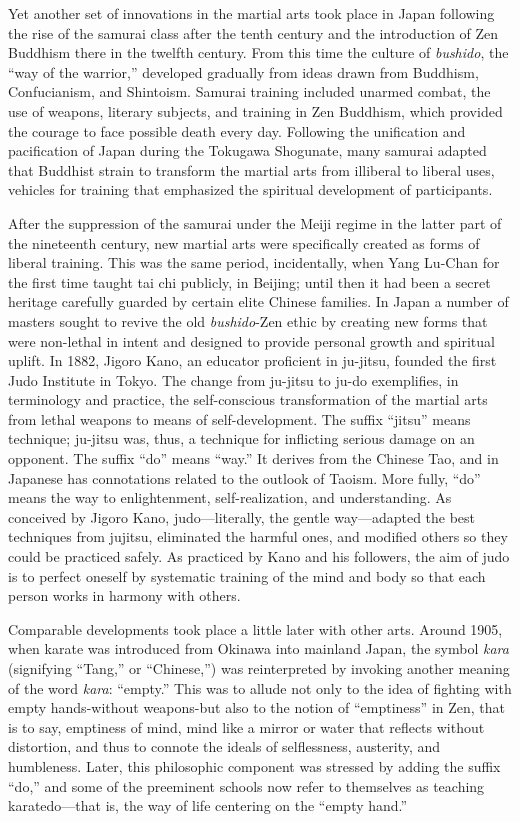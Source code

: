 Yet another set of innovations in the martial arts took place in Japan following the rise of the samurai class after the tenth century and the introduction of Zen Buddhism there in the twelfth century. From this time the culture of \emph{bushido}, the ``way of the warrior,'' developed gradually from ideas drawn from Buddhism, Confucianism, and Shintoism. Samurai training included unarmed combat, the use of weapons, literary subjects, and training in Zen Buddhism, which provided the courage to face possible death every day. Following the unification and pacification of Japan during the Tokugawa Shogunate, many samurai adapted that Buddhist strain to transform the martial arts from illiberal to liberal uses, vehicles for training that emphasized the spiritual development of participants. 

After the suppression of the samurai under the Meiji regime in the latter part of the nineteenth century, new martial arts were specifically created as forms of liberal training. This was the same period, incidentally, when Yang Lu-Chan for the first time taught tai chi publicly, in Beijing; until then it had been a secret heritage carefully guarded by certain elite Chinese families. In Japan a number of masters sought to revive the old \emph{bushido}-Zen ethic by creating new forms that were non-lethal in intent and designed to provide personal growth and spiritual uplift. In 1882, Jigoro Kano, an educator proficient in ju-jitsu, founded the first Judo Institute in Tokyo. The change from ju-jitsu to ju-do exemplifies, in terminology and practice, the self-conscious transformation of the martial arts from lethal weapons to means of self-development. The suffix ``jitsu'' means technique; ju-jitsu was, thus, a technique for inflicting serious damage on an opponent. The suffix ``do'' means ``way.'' It derives from the Chinese Tao, and in Japanese has connotations related to the outlook of Taoism. More fully, ``do'' means the way to enlightenment, self-realization, and understanding. As conceived by Jigoro Kano, judo---literally, the gentle way---adapted the best techniques from jujitsu, eliminated the harmful ones, and modified others so they could be practiced safely. As practiced by Kano and his followers, the aim of judo is to perfect oneself by systematic training of the mind and body so that each person works in harmony with others. 

Comparable developments took place a little later with other arts. Around 1905, when karate was introduced from Okinawa into mainland Japan, the symbol \emph{kara} (signifying ``Tang,'' or ``Chinese,'') was reinterpreted by invoking another meaning of the word \emph{kara}: ``empty.'' This was to allude not only to the idea of fighting with empty hands-without weapons-but also to the notion of ``emptiness'' in Zen, that is to say, emptiness of mind, mind like a mirror or water that reflects without distortion, and thus to connote the ideals of selflessness, austerity, and humbleness. Later, this philosophic component was stressed by adding the suffix ``do,'' and some of the preeminent schools now refer to themselves as teaching karatedo---that is, the way of life centering on the ``empty hand.''

